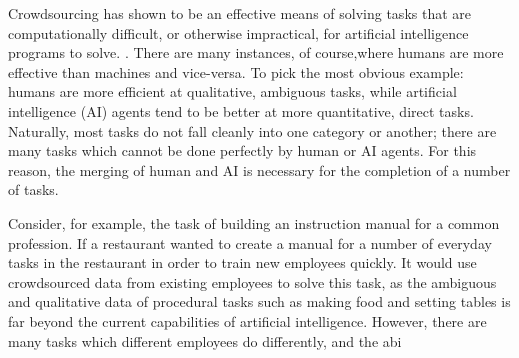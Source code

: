 Crowdsourcing has shown to be an effective means of solving tasks that are computationally difficult, or otherwise impractical, for artificial intelligence programs to solve. \cite{howie2006rise}. 
There are many instances, of course,where humans are more effective than machines and vice-versa. 
To pick the most obvious example: humans are more efficient at qualitative, ambiguous tasks, while artificial intelligence (AI) agents tend to be better at more quantitative, direct tasks.
Naturally, most tasks do not fall cleanly into one category or another; there are many tasks which cannot be done perfectly by human or AI agents. 
For this reason, the merging of human and AI is necessary for the completion of a number of tasks.

Consider, for example, the task of building an instruction manual for a common profession. 
If a restaurant wanted to create a manual for a number of everyday tasks in the restaurant in order to train new employees quickly.
It would use crowdsourced data from existing employees to solve this task, as the ambiguous and qualitative data of procedural tasks such as making food and setting tables is far beyond the current capabilities of artificial intelligence.
However, there are many tasks which different employees do differently, and the abi